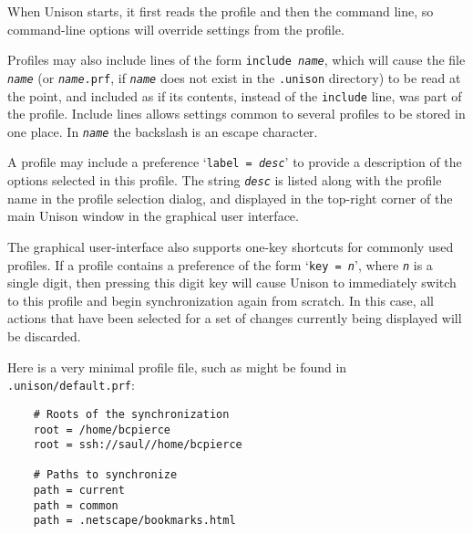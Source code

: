 \documentclass{article}
\newcommand{\ARG}[1]{\texttt{\textit{#1}}}
\begin{document}
When Unison starts, it first reads the profile and then the command
line, so command-line options will override settings from the
profile.

Profiles may also include lines of the form \texttt{include
  \ARG{name}}, which will cause the file \ARG{name} (or
\texttt{\ARG{name}.prf}, if \ARG{name} does not exist in the
\verb+.unison+ directory) to be read at the point, and included as if
its contents, instead of the \texttt{include} line, was part of the
profile.  Include lines allows settings common to several profiles to
be stored in one place.  In \ARG{name} the backslash is an escape
character.

A profile may include a preference `\texttt{label = \ARG{desc}}' to
provide a description of the options selected in this profile.  The
string \ARG{desc} is listed along with the profile name in the profile
selection dialog, and displayed in the top-right corner of the main
Unison window in the graphical user interface.

The graphical user-interface also supports one-key shortcuts for commonly
used profiles.  If a profile contains a preference of the form
%
`\texttt{key = \ARG{n}}', where \ARG{n} is a single digit, then
pressing this digit key will cause Unison to immediately switch to
this profile and begin synchronization again from scratch.  In this
case, all actions that have been selected for a set of changes
currently being displayed will be discarded.




Here is a very minimal profile file, such as might be found in {\tt
  .unison/default.prf}:
\begin{verbatim}
    # Roots of the synchronization
    root = /home/bcpierce
    root = ssh://saul//home/bcpierce

    # Paths to synchronize
    path = current
    path = common
    path = .netscape/bookmarks.html
\end{verbatim}

\end{document}
